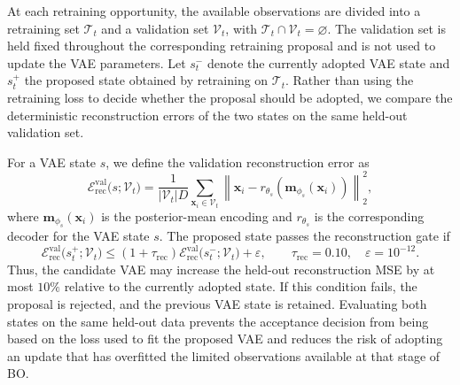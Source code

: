 \documentclass[pdflatex,sn-mathphys-num]{sn-jnl}%
\theoremstyle{thmstyleone}%
\theoremstyle{thmstyletwo}%
\theoremstyle{thmstylethree}%
\begin{document}
At each retraining opportunity, the available observations are divided into a retraining set $\mathcal T_t$ and a validation set $\mathcal V_t$, with $\mathcal T_t\cap\mathcal V_t=\varnothing$. The validation set is held fixed throughout the corresponding retraining proposal and is not used to update the VAE parameters. Let $s_t^{-}$ denote the currently adopted VAE state and $s_t^{+}$ the proposed state obtained by retraining on $\mathcal T_t$. Rather than using the retraining loss to decide whether the proposal should be adopted, we compare the deterministic reconstruction errors of the two states on the same held-out validation set.

For a VAE state $s$, we define the validation reconstruction error as
\begin{equation}
  \mathcal E_{\mathrm{rec}}^{\mathrm{val}}
  \bigl(s;\mathcal V_t\bigr)
  =
  \frac{1}{|\mathcal V_t|D}
  \sum_{\mathbf{x}_i\in\mathcal V_t}
  \left\|
    \mathbf{x}_i-
    r_{\theta_s}\!\left(\mathbf{m}_{\phi_s}(\mathbf{x}_i)\right)
  \right\|_2^2,
  \label{eq:validation-reconstruction-error}
\end{equation}
where $\mathbf{m}_{\phi_s}(\mathbf{x}_i)$ is the posterior-mean encoding and $r_{\theta_s}$ is the corresponding decoder for the VAE state $s$. The proposed state passes the reconstruction gate if
\begin{equation}
  \mathcal E_{\mathrm{rec}}^{\mathrm{val}}
  \bigl(s_t^{+};\mathcal V_t\bigr)
  \leq
  (1+\tau_{\mathrm{rec}})
  \mathcal E_{\mathrm{rec}}^{\mathrm{val}}
  \bigl(s_t^{-};\mathcal V_t\bigr)
  +\varepsilon,
  \qquad
  \tau_{\mathrm{rec}}=0.10,
  \quad
  \varepsilon=10^{-12}.
  \label{eq:validation-reconstruction-acceptance}
\end{equation}
Thus, the candidate VAE may increase the held-out reconstruction MSE by at most $10\%$ relative to the currently adopted state. If this condition fails, the proposal is rejected, and the previous VAE state is retained. Evaluating both states on the same held-out data prevents the acceptance decision from being based on the loss used to fit the proposed VAE and reduces the risk of adopting an update that has overfitted the limited observations available at that stage of BO.
\end{document}
